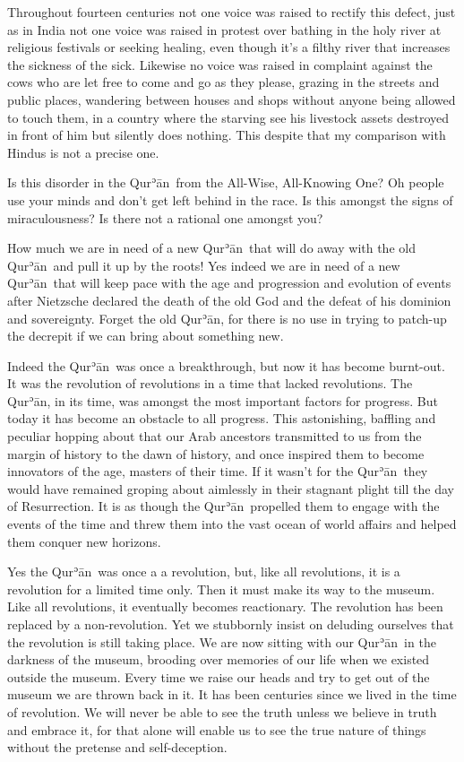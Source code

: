 \documentclass[12pt]{memoir}
\def\´{ʾ} %
\def \Quran{Qur\-\´ān} %
\def\–{-\hskip0pt}
\begin{document}
Throughout fourteen centuries not one voice was raised to rectify this defect,
just as in India not one voice was raised in protest
over bathing in the holy river at religious festivals or seeking healing,
even though it’s a filthy river that increases the sickness of the sick.
Likewise no voice was raised in complaint against the cows who are let free
to come and go as they please, grazing in the streets and public places,
wandering between houses and shops without anyone being allowed to touch them,
in a country where the starving see his livestock assets
destroyed in front of him but silently does nothing.
This despite that my comparison with Hindus is not a precise one.

Is this disorder in the \Quran\ from the All\–Wise, All\–Knowing One?
Oh people use your minds and don’t get left behind in the race.
Is this amongst the signs of miraculousness?
Is there not a rational one amongst you?

How much we are in need of a new \Quran\ that will do away
with the old \Quran\ and pull it up by the roots!
Yes indeed we are in need of a new \Quran\ that will keep pace with the age
and progression and evolution of events after Nietzsche declared the death
of the old God and the defeat of his dominion and sovereignty.
Forget the old \Quran, for there is no use in trying to patch-up
the decrepit if we can bring about something new.

Indeed the \Quran\ was once a breakthrough, but now it has become burnt-out.
It was the revolution of revolutions in a time that lacked revolutions.
The \Quran, in its time, was amongst the most important factors for progress.
But today it has become an obstacle to all progress.
This astonishing, baffling and peculiar hopping about that our Arab ancestors
transmitted to us from the margin of history to the dawn of history,
and once inspired them to become innovators of the age, masters of their time.
If it wasn’t for the \Quran\ they would have remained groping about
aimlessly in their stagnant plight till the day of Resurrection.
It is as though the \Quran\ propelled them to engage with the events
of the time and threw them into the vast ocean of world affairs
and helped them conquer new horizons.

Yes the \Quran\ was once a a revolution, but, like all revolutions,
it is a revolution for a limited time only.
Then it must make its way to the museum.
Like all revolutions, it eventually becomes reactionary.
The revolution has been replaced by a non\–revolution.
Yet we stubbornly insist on deluding ourselves
that the revolution is still taking place.
We are now sitting with our \Quran\ in the darkness of the museum,
brooding over memories of our life when we existed outside the museum.
Every time we raise our heads and try to get out of the museum
we are thrown back in it.
It has been centuries since we lived in the time of revolution.
We will never be able to see the truth unless
we believe in truth and embrace it,
for that alone will enable us to see the true nature of things
without the pretense and self\–deception.
\end{document}

